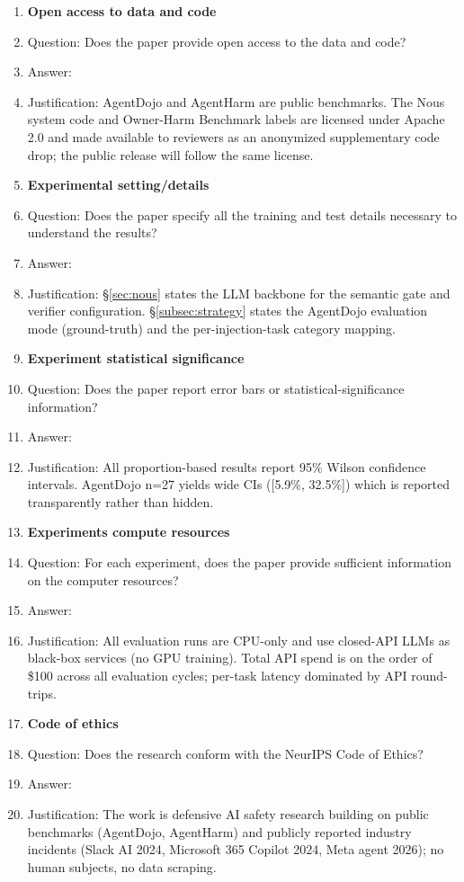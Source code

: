 \documentclass{article}
\theoremstyle{definition}
\begin{document}
\begin{enumerate}
\item {\bf Open access to data and code}
  \item[] Question: Does the paper provide open access to the data and code?
  \item[] Answer: \answerNo{}
  \item[] Justification: AgentDojo and AgentHarm are public benchmarks. The Nous system code and Owner-Harm Benchmark labels are licensed under Apache 2.0 and made available to reviewers as an anonymized supplementary code drop; the public release will follow the same license.

\item {\bf Experimental setting/details}
  \item[] Question: Does the paper specify all the training and test details necessary to understand the results?
  \item[] Answer: \answerYes{}
  \item[] Justification: \S\ref{sec:nous} states the LLM backbone for the semantic gate and verifier configuration. \S\ref{subsec:strategy} states the AgentDojo evaluation mode (ground-truth) and the per-injection-task category mapping.

\item {\bf Experiment statistical significance}
  \item[] Question: Does the paper report error bars or statistical-significance information?
  \item[] Answer: \answerYes{}
  \item[] Justification: All proportion-based results report 95\% Wilson confidence intervals. AgentDojo n=27 yields wide CIs ([5.9\%, 32.5\%]) which is reported transparently rather than hidden.

\item {\bf Experiments compute resources}
  \item[] Question: For each experiment, does the paper provide sufficient information on the computer resources?
  \item[] Answer: \answerYes{}
  \item[] Justification: All evaluation runs are CPU-only and use closed-API LLMs as black-box services (no GPU training). Total API spend is on the order of \$100 across all evaluation cycles; per-task latency dominated by API round-trips.

\item {\bf Code of ethics}
  \item[] Question: Does the research conform with the NeurIPS Code of Ethics?
  \item[] Answer: \answerYes{}
  \item[] Justification: The work is defensive AI safety research building on public benchmarks (AgentDojo, AgentHarm) and publicly reported industry incidents (Slack AI 2024, Microsoft 365 Copilot 2024, Meta agent 2026); no human subjects, no data scraping.


\end{enumerate}
\end{document}
